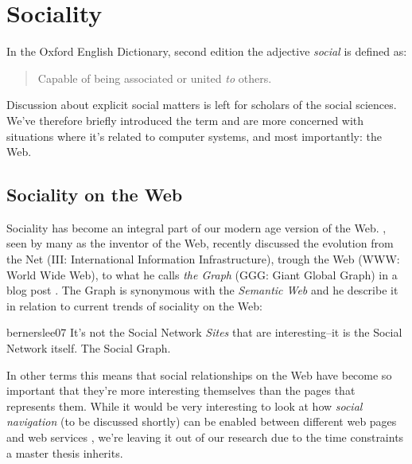 \section{Sociality}

In the Oxford English Dictionary, second edition \citep[p.~905]{simpson89}
the adjective \emph{social} is defined as:

\begin{quote}
  Capable of being associated or united \emph{to} others.
\end{quote}

Discussion about explicit social matters is left for scholars of the social
sciences. We've therefore briefly introduced the term and are more concerned
with situations where it's related to computer systems, and most importantly:
the Web.

\subsection{Sociality on the Web}

Sociality has become an integral part of our modern age version of the Web.
\citeauthor{bernerslee07}, seen by many as the inventor of the Web,
recently discussed the evolution from the Net (III: International
Information Infrastructure), trough the Web (WWW: World Wide Web),
to what he calls \emph{the Graph} (GGG: Giant Global Graph) in a
blog post \citeyearpar{bernerslee07}. The Graph is synonymous with the
\emph{Semantic Web}%
and he describe it in relation to
current trends of sociality on the Web:
\begin{citequote}{bernerslee07}
  It's not the Social Network \emph{Sites} that are interesting--it is the
  Social Network itself. The Social Graph.
\end{citequote}

In other terms this means that social relationships on the Web have become so
important that they're more interesting themselves than the pages that
represents them. While it would be very interesting to look at how
\emph{social navigation} (to be discussed shortly) can be enabled between
different web pages and web services%
, we're leaving it out of our research
due to the time constraints a master thesis inherits.

